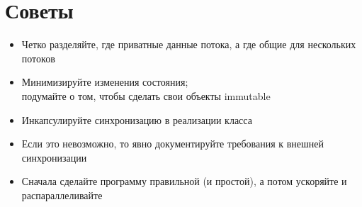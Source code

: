 \documentclass[unicode,mathserif]{beamer}
\begin{document}
\section{Советы}

\begin{frame}
\begin{itemize}
\item Четко разделяйте, где приватные данные потока,
    а где общие для нескольких потоков
\item Минимизируйте изменения состояния;\\
    подумайте о том, чтобы сделать свои объекты immutable
\item Инкапсулируйте синхронизацию в реализации класса
\item Если это невозможно, то явно документируйте требования к внешней
    синхронизации
\item Сначала сделайте программу правильной (и простой), а потом
    ускоряйте и распараллеливайте
\end{itemize}
\end{frame}
\end{document}
